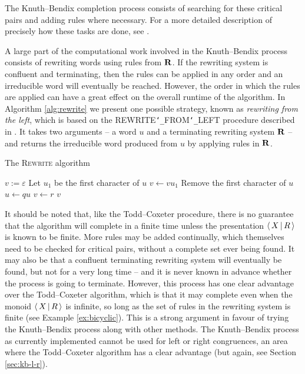 The Knuth--Bendix completion process consists of searching for these critical
pairs and adding rules where necessary.  For a more detailed description of
precisely how these tasks are done, see \cite[\S 2.6]{sims}.

A large part of the computational work involved in the Knuth--Bendix process
consists of rewriting words using rules from $\mathbf{R}$.  If the rewriting system is
confluent and terminating, then the rules can be applied in any order and an
irreducible word will eventually be reached.  However, the order in which the
rules are applied can have a great effect on the overall runtime of the
algorithm.  In Algorithm \ref{alg:rewrite} we present one possible strategy,
known as \textit{rewriting from the left}, which is based on the
REWRITE\texttt{\char`_}FROM\texttt{\char`_}LEFT procedure described in
\cite[\S2.4]{sims}.  It takes two arguments -- a word $u$ and a terminating
rewriting system $\mathbf{R}$ -- and returns the irreducible word produced from $u$ by
applying rules in $\mathbf{R}$.

\begin{algorithm}
\caption{The \textsc{Rewrite} algorithm}
\label{alg:rewrite}
\begin{algorithmic}[1]
\State $v := \varepsilon$
  \State Let $u_1$ be the first character of $u$
  \State $v \gets v u_1$
  \State Remove the first character of $u$
      \State $u \gets qu$
      \State $v \gets r$
      \State \Break
    \EndIf
  \EndFor
\EndWhile
\State \Return $v$
\EndProcedure
\end{algorithmic}
\end{algorithm}

It should be noted that, like the Todd--Coxeter procedure, there is no guarantee
that the algorithm will complete in a finite time unless the presentation
$\left\langle \, X \, \middle| \, R \, \right\rangle$ is known to be finite.  More rules may be added continually, which
themselves need to be checked for critical pairs, without a complete set ever
being found.  It may also be that a confluent terminating rewriting system will
eventually be found, but not for a very long time -- and it is never known in
advance whether the process is going to terminate.  However, this process has
one clear advantage over the Todd--Coxeter algorithm, which is that it may complete even when
the monoid $\left\langle \, X \, \middle| \, R \, \right\rangle$ is infinite, so long as the set of rules in the rewriting
system is finite (see Example \ref{ex:bicyclic}).  This is a strong argument in
favour of trying the Knuth--Bendix process along with other methods.  The
Knuth--Bendix process as currently implemented cannot be used for left or right
congruences, an area where the Todd--Coxeter algorithm has a clear advantage (but again, see
Section \ref{sec:kb-l-r}).

